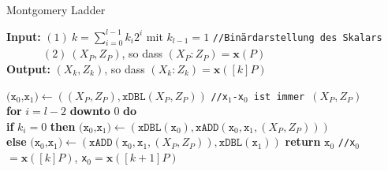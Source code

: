 \begin{frame}{Montgomery Ladder}
    \begin{algorithm}[H]
        \caption{\textbf{Algorithmus: Montgomery Ladder}}
        
        
        \textbf{Input:} $(1)\ k=\sum\nolimits_{i=0}^{l-1}k_i2^i$ mit $k_{l-1}=1$ \hfill \texttt{//Binärdarstellung des Skalars} \\ 
        \text{} $\quad \quad \quad \; (2)\ (X_P,Z_P)$, so dass $(X_P:Z_P)=\textbf{x}(P)$ \\
        \textbf{Output:} $(X_k,Z_k)$, so dass $(X_k:Z_k)=\textbf{x}([k]P)$
        
        \begin{algorithmic}[1]
            \State $\texttt{(x$_0$,x$_1$)} \gets ((X_P, Z_P), \texttt{xDBL}(X_P, Z_P))$ \hfill \texttt{//x$_1$-x$_0$ ist immer $(X_P,Z_P)$} \\
            \textbf{for} $i = l-2$ \textbf{downto} 0 \textbf{do}\\
            \quad \textbf{if} $k_i = 0$ \textbf{then}
            \State \quad \quad $\texttt{(x$_0$,x$_1$)} \gets (\texttt{xDBL}(\texttt{x$_0$}),\texttt{xADD}(\texttt{x$_0$},\texttt{x$_1$},(X_P,Z_P)))$ \\
            \quad \textbf{else}
            \State \quad \quad $\texttt{(x$_0$,x$_1$)} \gets (\texttt{xADD}(\texttt{x$_0$},\texttt{x$_1$},(X_P,Z_P)),\texttt{xDBL}(\texttt{x$_1$}))$
            \State \textbf{return} $\texttt{x$_0$}$ \hfill \texttt{//x$_0$}$=\textbf{x}([k]P)$, \texttt{x$_0$}$=\textbf{x}([k+1]P)$
            
         
        \end{algorithmic}
    \end{algorithm}
    
\end{frame}

